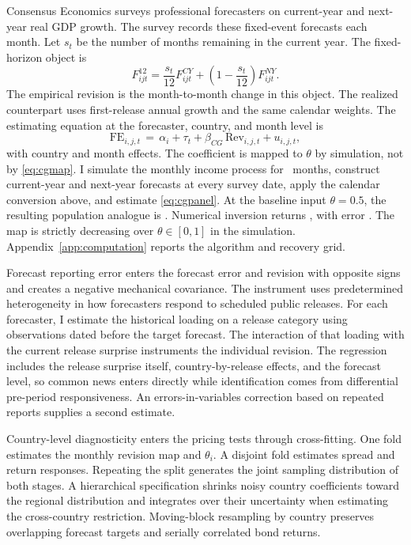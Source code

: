 \documentclass[11pt]{article}
\theoremstyle{definition}
\begin{document}
Consensus Economics surveys professional forecasters on current-year and next-year real GDP growth. The survey records these fixed-event forecasts each month. Let $s_t$ be the number of months remaining in the current year. The fixed-horizon object is
\[
F^{12}_{i j t}=\frac{s_t}{12}F^{CY}_{i j t}
+\left(1-\frac{s_t}{12}\right)F^{NY}_{i j t}.
\]
The empirical revision is the month-to-month change in this object. The realized counterpart uses first-release annual growth and the same calendar weights. The estimating equation at the forecaster, country, and month level is
\begin{equation}
\mathrm{FE}_{i,j,t} \,=\, \alpha_i + \tau_t + \beta_{CG}\, \mathrm{Rev}_{i,j,t} + u_{i,j,t},
\label{eq:cgpanel}
\end{equation}
with country and month effects. The coefficient is mapped to $\theta$ by simulation, not by \eqref{eq:cgmap}. I simulate the monthly income process for \SurveyMonths\ months, construct current-year and next-year forecasts at every survey date, apply the calendar conversion above, and estimate \eqref{eq:cgpanel}. At the baseline input $\theta=0.5$, the resulting population analogue is \SurveyBetaHalf. Numerical inversion returns \SurveyThetaRecovered, with error \SurveyRecoveryError. The map is strictly decreasing over $\theta\in[0,1]$ in the simulation. Appendix~\ref{app:computation} reports the algorithm and recovery grid.

Forecast reporting error enters the forecast error and revision with opposite signs and creates a negative mechanical covariance. The instrument uses predetermined heterogeneity in how forecasters respond to scheduled public releases. For each forecaster, I estimate the historical loading on a release category using observations dated before the target forecast. The interaction of that loading with the current release surprise instruments the individual revision. The regression includes the release surprise itself, country-by-release effects, and the forecast level, so common news enters directly while identification comes from differential pre-period responsiveness. An errors-in-variables correction based on repeated reports supplies a second estimate.

Country-level diagnosticity enters the pricing tests through cross-fitting. One fold estimates the monthly revision map and $\theta_i$. A disjoint fold estimates spread and return responses. Repeating the split generates the joint sampling distribution of both stages. A hierarchical specification shrinks noisy country coefficients toward the regional distribution and integrates over their uncertainty when estimating the cross-country restriction. Moving-block resampling by country preserves overlapping forecast targets and serially correlated bond returns.
\end{document}
